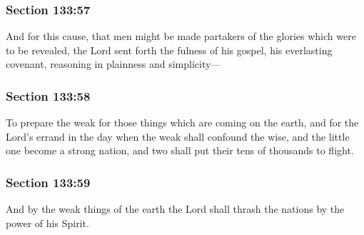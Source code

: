 	\subsubsection{Section 133:57} %
		\label{DC133-57}

		And for this cause, that men might be made partakers of the glories which were to be revealed, the Lord sent forth the fulness of his gospel, his everlasting covenant, reasoning in plainness and simplicity---


	\subsubsection{Section 133:58} %
		\label{DC133-58}

		To prepare the weak for those things which are coming on the earth, and for the Lord's errand in the day when the weak shall confound the wise, and the little one become a strong nation, and two shall put their tens of thousands to flight.


	\subsubsection{Section 133:59} %
		\label{DC133-59}

		And by the weak things of the earth the Lord shall thrash the nations by the power of his Spirit.


